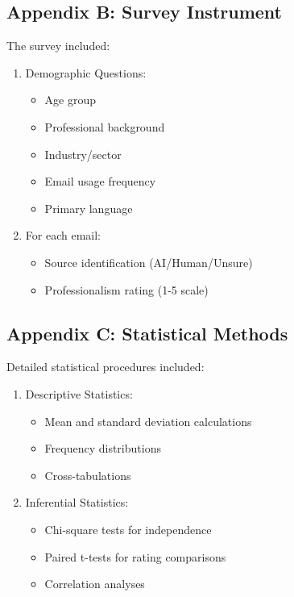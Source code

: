 \documentclass[
]{article}
\providecommand{\tightlist}{%
  \setlength{\itemsep}{0pt}\setlength{\parskip}{0pt}}\usepackage{longtable,booktabs,array}
\begin{document}
\subsection{Appendix B: Survey
Instrument}\label{appendix-b-survey-instrument}

The survey included:

\begin{enumerate}
\def\labelenumi{\arabic{enumi}.}
\tightlist
\item
  Demographic Questions:

  \begin{itemize}
  \tightlist
  \item
    Age group
  \item
    Professional background
  \item
    Industry/sector
  \item
    Email usage frequency
  \item
    Primary language
  \end{itemize}
\item
  For each email:

  \begin{itemize}
  \tightlist
  \item
    Source identification (AI/Human/Unsure)
  \item
    Professionalism rating (1-5 scale)
  \end{itemize}
\end{enumerate}

\subsection{Appendix C: Statistical
Methods}\label{appendix-c-statistical-methods}

Detailed statistical procedures included:

\begin{enumerate}
\def\labelenumi{\arabic{enumi}.}
\tightlist
\item
  Descriptive Statistics:

  \begin{itemize}
  \tightlist
  \item
    Mean and standard deviation calculations
  \item
    Frequency distributions
  \item
    Cross-tabulations
  \end{itemize}
\item
  Inferential Statistics:

  \begin{itemize}
  \tightlist
  \item
    Chi-square tests for independence
  \item
    Paired t-tests for rating comparisons
  \item
    Correlation analyses
  \end{itemize}
\end{enumerate}
\end{document}
